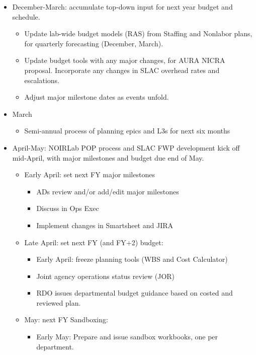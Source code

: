 \begin{itemize}
\item December-March: accumulate top-down input for next year budget and schedule.
   \begin{itemize}
      \item Update lab-wide budget models (RAS) from Staffing and Nonlabor plans, for quarterly forecasting (December, March).
      \item Update budget tools with any major changes, for AURA NICRA proposal. Incorporate any changes in SLAC overhead rates and escalations.
      \item Adjust major milestone dates as events unfold.
   \end{itemize}
\item March
   \begin{itemize}
      \item Semi-annual process of planning epics and L3s for next six months
   \end{itemize}
\item April-May: NOIRLab POP process and SLAC FWP development kick off mid-April, with major milestones and budget due end of May.
    \begin{itemize}
       \item Early April: set next FY major milestones
          \begin{itemize}
             \item ADs review and/or add/edit major milestones
             \item Discuss in Ops Exec
             \item Implement changes in Smartsheet and \gls{JIRA}
          \end{itemize}
       \item Late April: set next FY (and FY+2) budget:
          \begin{itemize}
            \item Early April: freeze planning tools (WBS and Cost Calculator)
            \item Joint agency operations status review (JOR)
            \item RDO issues departmental budget guidance based on costed and reviewed plan.
         \end{itemize}
       \item May: next FY Sandboxing:
         \begin{itemize}
            \item Early May: Prepare and issue sandbox workbooks, one per department.

\end{itemize}
\end{itemize}
\end{itemize}
